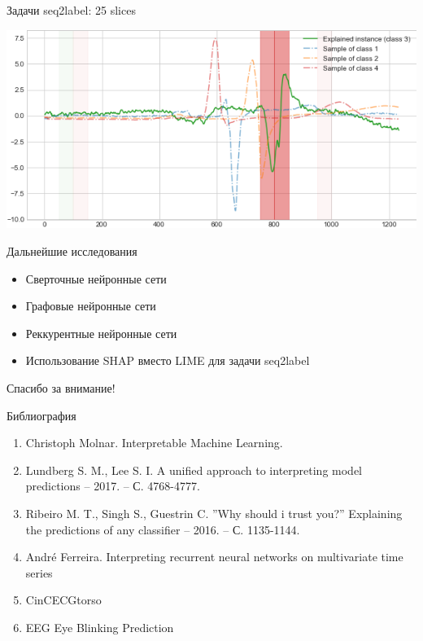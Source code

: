 \documentclass[fleqn, xcolor=x11names]{beamer}
\begin{document}
\begin{frame}{Задачи seq2label: 25 slices}

    \centering
    \includegraphics[width=\linewidth]{line_for_3_class_25_slices.png}

\end{frame}


\begin{frame}{Дальнейшие исследования}

    \begin{itemize}
        \item Сверточные нейронные сети
        \item Графовые нейронные сети
        \item Реккурентные нейронные сети
        \item Использование SHAP вместо LIME для задачи seq2label
    \end{itemize}
\end{frame}

\begin{frame}
    \LARGE Спасибо за внимание!
\end{frame}

\begin{frame}{Библиография}
    \begin{enumerate}  
        \item Christoph Molnar. Interpretable Machine Learning.
        \item Lundberg S. M., Lee S. I. A unified approach to interpreting model predictions – 2017. – С. 4768-4777.
        \item Ribeiro M. T., Singh S., Guestrin C. ''Why should i trust you?'' Explaining the predictions of any classifier – 2016. – С. 1135-1144.
        \item  André Ferreira. Interpreting recurrent neural networks on multivariate time series
        \item CinCECGtorso
        \item  EEG Eye Blinking Prediction
    \end{enumerate}
\end{frame}
\end{document}
